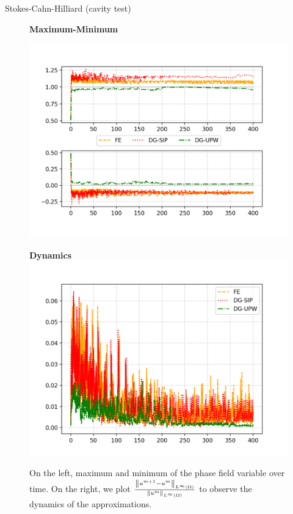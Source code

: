 \begin{frame}{Stokes-Cahn-Hilliard {\small(cavity test)}}
	\begin{figure}[t]
		\centering
		\begin{minipage}{0.49\linewidth}
			\centering
			\textbf{Maximum-Minimum}\par\smallskip
			\includegraphics[scale=0.37]{img/stokes-cahn-hilliard/max-min_stokes.png}
		\end{minipage}
		\begin{minipage}{0.49\linewidth}
			\centering
			\textbf{Dynamics}
			\includegraphics[scale=0.37]{img/stokes-cahn-hilliard/dynamics_stokes.png}
		\end{minipage}
		\caption{On the left, maximum and minimum of the phase field variable over time. On the right, we plot $\frac{\left\|u^{m+1}-u^m\right\|_{L^\infty (\Omega)}}{\left\|u^m\right\|_{L^\infty (\Omega)}}$ to observe the dynamics of the approximations.}
	\end{figure}
\end{frame}

